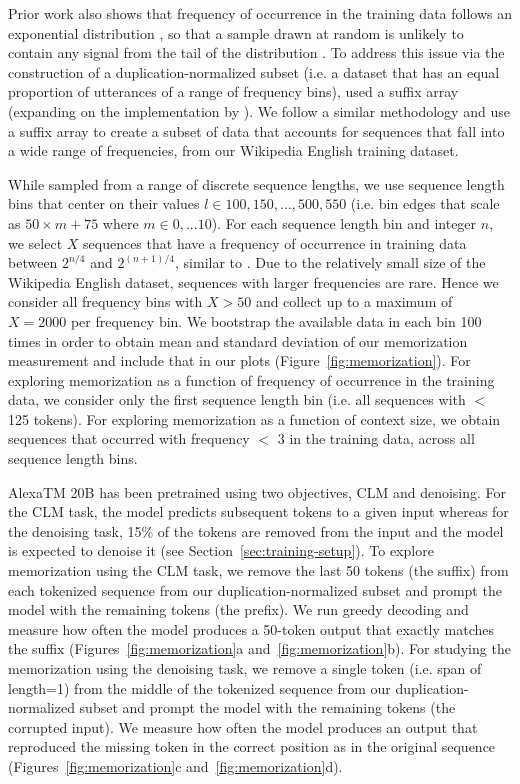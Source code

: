 Prior work also shows that frequency of occurrence in the training data follows an exponential distribution \citep{Lee2022DeduplicatingTD}, so that a sample drawn at random is unlikely to contain any signal from the tail of the distribution \citep{Carlini2022QuantifyingMA}. To address this issue via the construction of a duplication-normalized subset (i.e. a dataset that has an equal proportion of utterances of a range of frequency bins), \citet{Carlini2022QuantifyingMA} used a suffix array (expanding on the implementation by \citealt{Lee2022DeduplicatingTD}). We follow a similar methodology and use a suffix array to create a subset of data that accounts for sequences that fall into a wide range of frequencies, from our Wikipedia English training dataset.

While \citet{Carlini2022QuantifyingMA} sampled from a range of discrete sequence lengths, we use sequence length bins that center on their values $l \in  {100,150,...,500, 550}$ (i.e. bin edges that scale as $50\times{m} + 75$ where $m \in {0,...10}$). For each sequence length bin and integer $n$, we select $X$ sequences that have a frequency of occurrence in training data between $2^{n/4}$ and $2^{(n+1)/4}$, similar to \citet{Carlini2022QuantifyingMA}. Due to the relatively small size of the Wikipedia English dataset, sequences with larger frequencies are rare. Hence we consider all frequency bins with $X>50$ and collect up to a maximum of $X=2000$ per frequency bin. We bootstrap the available data in each bin 100 times in order to obtain mean and standard deviation of our memorization measurement and include that in our plots (Figure~\ref{fig:memorization}). For exploring memorization as a function of frequency of occurrence in the training data, we consider only the first sequence length bin (i.e. all sequences with $<$ 125 tokens). For exploring memorization as a function of context size, we obtain sequences that occurred with frequency $<$ 3 in the training data, across all sequence length bins. 

{AlexaTM 20B} has been pretrained using two objectives, CLM and denoising. For the CLM task, the model predicts subsequent tokens to a given input whereas for the denoising task, 15\% of the tokens are removed from the input and the model is expected to denoise it (see Section~\ref{sec:training-setup}). To explore memorization using the CLM task, we remove the last 50 tokens (the suffix) from each tokenized sequence from our duplication-normalized subset and prompt the model with the remaining tokens (the prefix). We run greedy decoding and measure how often the model produces a 50-token output that exactly matches the suffix (Figures~\ref{fig:memorization}a and~\ref{fig:memorization}b). For studying the memorization using the denoising task, we remove a single token (i.e. span of length=1) from the middle of the tokenized sequence from our duplication-normalized subset and prompt the model with the remaining tokens (the corrupted input). We measure how often the model produces an output that reproduced the missing token in the correct position as in the original sequence (Figures~\ref{fig:memorization}c and~\ref{fig:memorization}d).

